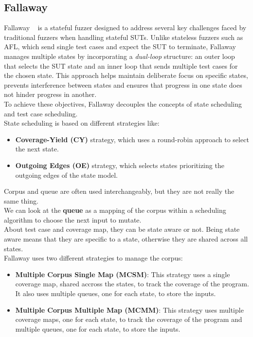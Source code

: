 \subsection{Fallaway}
Fallaway ~\cite{Fallaway} is a stateful fuzzer designed to address several key challenges faced by traditional fuzzers when handling stateful SUTs. Unlike stateless fuzzers such as AFL, which send single test cases and expect the SUT to terminate, Fallaway manages multiple states by incorporating a \textit{dual-loop} structure: an outer loop that selects the SUT state and an inner loop that sends multiple test cases for the chosen state. This approach helps maintain deliberate focus on specific states, prevents interference between states and ensures that progress in one state does not hinder progress in another.
\\To achieve these objectives, Fallaway decouples the concepts of state scheduling and test case scheduling.
\\State scheduling is based on different strategies like:
\begin{itemize}
    \item \textbf{Coverage-Yield (CY)} strategy, which uses a round-robin approach to select the next state.
    \item \textbf{Outgoing Edges (OE)} strategy, which selects states prioritizing the outgoing edges of the state model.
\end{itemize} 
Corpus and queue are often used interchangeably, but they are not really the same thing. \\We can look at the \textbf{queue} as a mapping of the corpus within a scheduling algorithm to choose the next input to mutate.
\\About test case and coverage map, they can be state aware or not. Being state aware means that they are specific to a state, otherwise they are shared across all states.
\\Fallaway uses two different strategies to manage the corpus:
\begin{itemize}
    \item \textbf{Multiple Corpus Single Map (MCSM)}: This strategy uses a single coverage map, shared accross the states, to track the coverage of the program. It also uses multiple queues, one for each state, to store the inputs.
    
    \item \textbf{Multiple Corpus Multiple Map (MCMM)}: This strategy uses multiple coverage maps, one for each state, to track the coverage of the program and multiple queues, one for each state, to store the inputs.
\end{itemize}
